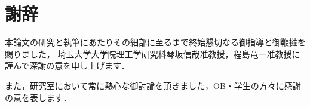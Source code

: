 ﻿
\chapter*{謝辞}\label{chapter:謝辞}

本論文の研究と執筆にあたりその細部に至るまで終始懇切なる御指導と御鞭撻を賜りました，
埼玉大学大学院理工学研究科琴坂信哉准教授，程島竜一准教授に謹んで深謝の意を申し上げます．

また，研究室において常に熱心な御討論を頂きました，OB・学生の方々に感謝の意を表します．
